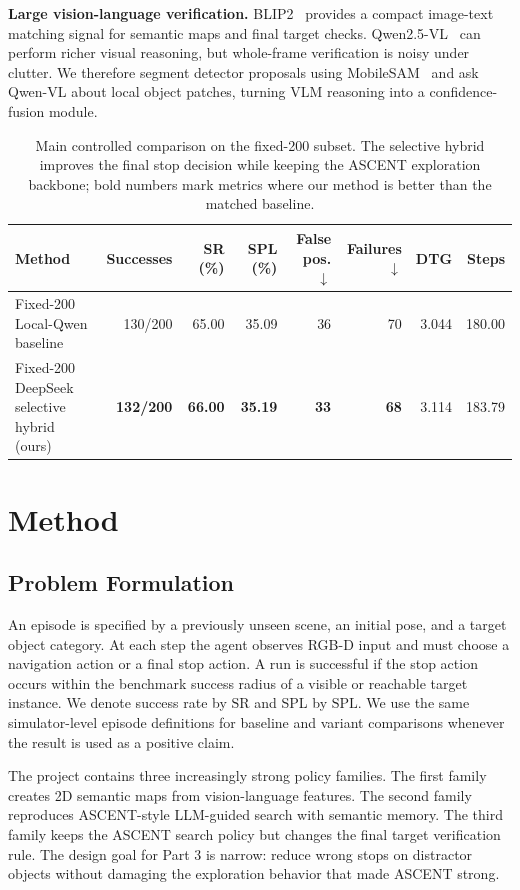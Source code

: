 \documentclass[10pt,twocolumn,letterpaper]{article}
\newcommand{\sr}{\mathrm{SR}}
\newcommand{\spl}{\mathrm{SPL}}
\begin{document}
\textbf{Large vision-language verification.} BLIP2~\cite{blip22023} provides a compact image-text matching signal for semantic maps and final target checks. Qwen2.5-VL~\cite{qwen25vl2025} can perform richer visual reasoning, but whole-frame verification is noisy under clutter. We therefore segment detector proposals using MobileSAM~\cite{mobilesam2023} and ask Qwen-VL about local object patches, turning VLM reasoning into a confidence-fusion module.

\begin{table}[t]
\centering
\small
\caption{Main controlled comparison on the fixed-200 subset. The selective hybrid improves the final stop decision while keeping the ASCENT exploration backbone; bold numbers mark metrics where our method is better than the matched baseline.}
\label{tab:main}
\begin{tabular}{lrrrrrrr}
\toprule
Method & Successes & SR (\%) & SPL (\%) & False pos. $\downarrow$ & Failures $\downarrow$ & DTG & Steps \\
\midrule
Fixed-200 Local-Qwen baseline & 130/200 & 65.00 & 35.09 & 36 & 70 & 3.044 & 180.00 \\
Fixed-200 DeepSeek selective hybrid (ours) & \textbf{132/200} & \textbf{66.00} & \textbf{35.19} & \textbf{33} & \textbf{68} & 3.114 & 183.79 \\
\bottomrule
\end{tabular}
\end{table}

\section{Method}
\subsection{Problem Formulation}
An episode is specified by a previously unseen scene, an initial pose, and a target object category. At each step the agent observes RGB-D input and must choose a navigation action or a final stop action. A run is successful if the stop action occurs within the benchmark success radius of a visible or reachable target instance. We denote success rate by $\sr$ and SPL by $\spl$. We use the same simulator-level episode definitions for baseline and variant comparisons whenever the result is used as a positive claim.

The project contains three increasingly strong policy families. The first family creates 2D semantic maps from vision-language features. The second family reproduces ASCENT-style LLM-guided search with semantic memory. The third family keeps the ASCENT search policy but changes the final target verification rule. The design goal for Part 3 is narrow: reduce wrong stops on distractor objects without damaging the exploration behavior that made ASCENT strong.
\end{document}
